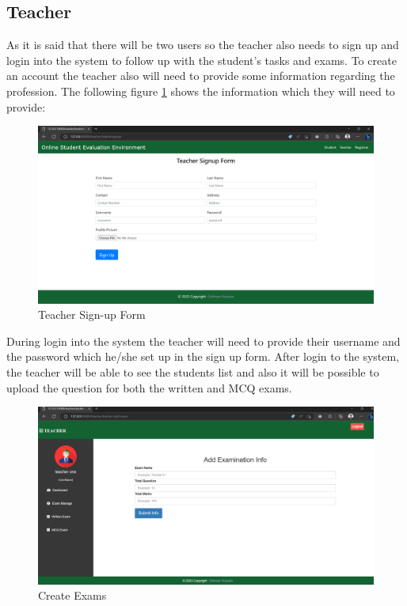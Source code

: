 \subsection{Teacher}
As it is said that there will be two users so the teacher also needs to sign up and login into the system to follow up with the student’s tasks and exams. To create an account the teacher also will need to provide some information regarding the profession. The following figure \ref{fig:teacherup} shows the information which they will need to provide:
\begin{figure}[H]
    \centering
    \includegraphics[scale=.35]{img/teacherup.png}
    \caption{Teacher Sign-up Form }
    \label{fig:teacherup}
\end{figure}
During login into the system the teacher will need to provide their username and the password which he/she set up in the sign up form. After login to the system, the teacher will be able to see the students list and also it will be possible to upload the question for both the written and MCQ exams.
\begin{figure}[H]
    \centering
    \includegraphics[scale=.35]{img/teacherques.png}
    \caption{Create Exams}
    \label{fig:teacherques}
\end{figure}
